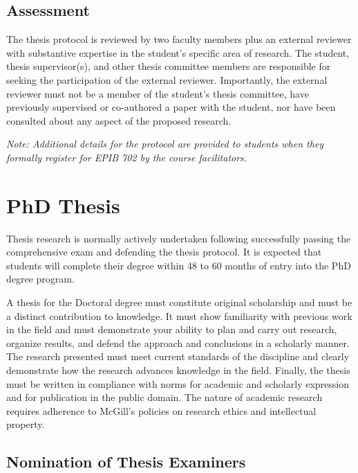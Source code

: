 \documentclass[
  letterpaper,
  DIV=11,
  numbers=noendperiod]{scrreprt}
\begin{document}
\section{Assessment}\label{assessment}

The thesis protocol is reviewed by two faculty members plus an external
reviewer with substantive expertise in the student's specific area of
research. The student, thesis supervisor(s), and other thesis committee
members are responsible for seeking the participation of the external
reviewer. Importantly, the external reviewer must not be a member of the
student's thesis committee, have previously supervised or co-authored a
paper with the student, nor have been consulted about any aspect of the
proposed research.

\emph{Note: Additional details for the protocol are provided to students
when they formally register for EPIB 702 by the course facilitators.}


\chapter{PhD Thesis}\label{phd-thesis}

Thesis research is normally actively undertaken following successfully
passing the comprehensive exam and defending the thesis protocol. It is
expected that students will complete their degree within 48 to 60 months
of entry into the PhD degree program.

A thesis for the Doctoral degree must constitute original scholarship
and must be a distinct contribution to knowledge. It must show
familiarity with previous work in the field and must demonstrate your
ability to plan and carry out research, organize results, and defend the
approach and conclusions in a scholarly manner. The research presented
must meet current standards of the discipline and clearly demonstrate
how the research advances knowledge in the field. Finally, the thesis
must be written in compliance with norms for academic and scholarly
expression and for publication in the public domain. The nature of
academic research requires adherence to McGill's policies on research
ethics and intellectual property.

\section{Nomination of Thesis
Examiners}\label{nomination-of-thesis-examiners}
\end{document}
